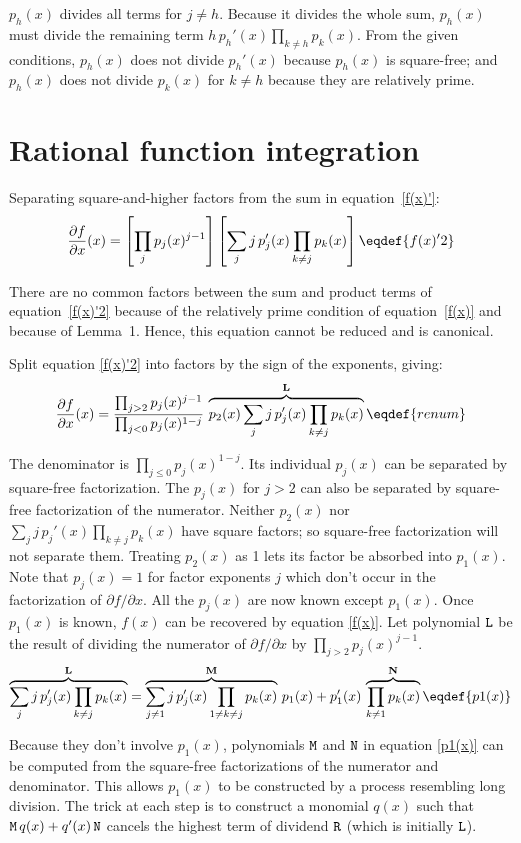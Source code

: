 $p_h(x)$ divides all terms for $j\neq h$.  Because it divides the
whole sum, $p_h(x)$ must divide the remaining term $h\,p_h'(x)
\prod_{k\neq h} p_k(x)$.  From the given conditions, $p_h(x)$
does not divide $p_h'(x)$ because $p_h(x)$ is square-free; and $p_h(x)$
does not divide $p_k(x)$ for $k\neq h$ because they are relatively
prime.

\section{Rational function integration}

Separating square-and-higher factors from the sum in
equation~\eqref{f(x)'}:
$${\partial{f}\over \partial{x}}(x) = \left[ \prod_j p_j(x)^{j-1} \right]
\left[\sum_j j\,{p_j'}(x)\prod_{k\neq j} p_k(x)\right]\eqdef{f(x)'2}$$

There are no common factors between the sum and product terms of
equation~\eqref{f(x)'2} because of the relatively prime condition of
equation~\eqref{f(x)} and because of Lemma~1.  Hence, this equation
cannot be reduced and is canonical.

Split equation \eqref{f(x)'2} into factors by the sign of the exponents,
giving:
$${\partial{f}\over \partial{x}}(x)
 ={\prod_{j>2}p_j(x)^{j-1}\over\prod_{j<0} p_j(x)^{1-j}}\,
 \overbrace{p_2(x)\,{\sum_{j}j\,{p_j'}(x)\prod_{k\neq j}p_k(x)}}^{\bf L}
\eqdef{renum}$$

The denominator is $\prod_{j\le0} p_j(x)^{1-j}$.  Its individual
$p_j(x)$ can be separated by square-free factorization.  The $p_j(x)$
for $j>2$ can also be separated by square-free factorization of the
numerator.  Neither $p_2(x)$ nor
${\sum_{j}j\,{p_j'}(x)\prod_{k\neq{j}}p_k(x)}$ have square factors; so
square-free factorization will not separate them.  Treating $p_2(x)$
as 1 lets its factor be absorbed into $p_1(x)$.  Note that $p_j(x)=1$
for factor exponents $j$ which don't occur in the factorization of
$\partial{f}/\partial{x}$.  All the $p_j(x)$ are now known except $p_1(x)$.  Once
$p_1(x)$ is known, $f(x)$ can be recovered by equation \eqref{f(x)}.
Let polynomial ${\tt{L}}$ be the result of dividing the numerator of
$\partial{f}/\partial{x}$ by $\prod_{j>2}p_j(x)^{j-1}$.
$$\overbrace{\sum_{j}j\,{p_j'}(x)\prod_{k\neq j} p_k(x)}^{\bf L}=
  \overbrace{\sum_{j\ne1}j\,{p_j'}(x)\prod_{1\neq k\neq j}p_k(x)}^{{\bf M}}\,p_1(x)
  +{p_1'}(x)\,\overbrace{\prod_{k\neq1}p_k(x)}^{{\bf N}}\eqdef{p1(x)}$$

Because they don't involve $p_1(x)$, polynomials ${\tt{M}}$ and
${\tt{N}}$ in equation \eqref{p1(x)} can be computed from the
square-free factorizations of the numerator and denominator.  This
allows $p_1(x)$ to be constructed by a process resembling long
division.  The trick at each step is to construct a monomial $q(x)$
such that ${\tt{M}}\,q(x)+q'(x)\,{\tt{N}}$ cancels the highest term of
dividend ${\tt{R}}$ (which is initially ${\tt{L}}$).

